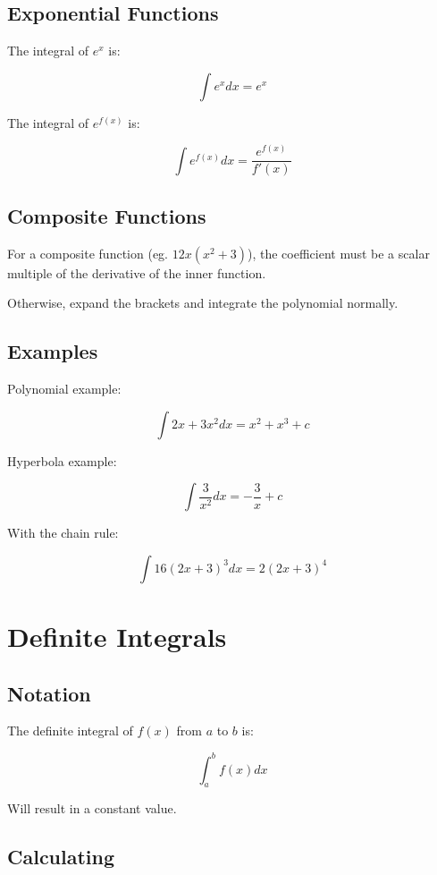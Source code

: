 \documentclass[a4paper,11pt]{article}
\begin{document}
\subsection{Exponential Functions}

The integral of $e^x$ is:

$$
\int e^x dx = e^x
$$

The integral of $e^{f(x)}$ is:

$$
\int e^{f(x)} dx = \frac{e^{f(x)}}{f'(x)}
$$


\subsection{Composite Functions}

For a composite function (eg. $12x(x^2 + 3)$), the coefficient must be a scalar
multiple of the derivative of the inner function.

Otherwise, expand the brackets and integrate the polynomial normally.


\subsection{Examples}

Polynomial example:

$$
\int 2x + 3x^2 dx = x^2 + x^3 + c
$$

Hyperbola example:

$$
\int \frac{3}{x^2} dx = -\frac{3}{x} + c
$$

With the chain rule:

$$
\int 16(2x + 3)^3 dx = 2(2x + 3)^4
$$




\section{Definite Integrals}

\subsection{Notation}

The definite integral of $f(x)$ from $a$ to $b$ is:

$$
\int_a^b f(x) dx
$$

Will result in a constant value.


\subsection{Calculating}
\end{document}
